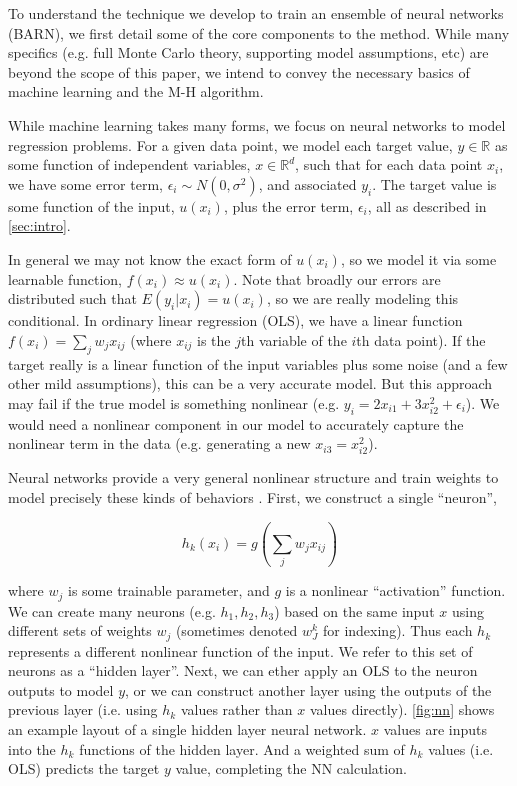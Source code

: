 \documentclass[12pt]{article}
\begin{document}

To understand the technique we develop to train an ensemble of neural networks (BARN), we first detail some of the core components to the method.  While many specifics (e.g. full Monte Carlo theory, supporting model assumptions, etc) are beyond the scope of this paper, we intend to convey the necessary basics of machine learning and the M-H algorithm.

While machine learning takes many forms, we focus on neural networks to model regression problems.  For a given data point, we model each target value, $y \in \mathbb{R}$ as some function of independent variables, $x \in \mathbb{R}^d$, such that for each data point $x_i$, we have some error term, $\epsilon_i \sim N(0,\sigma^2)$, and associated $y_i$.  The target value is some function of the input, $u(x_i)$, plus the error term, $\epsilon_i$, all as described in \ref{sec:intro}.

In general we may not know the exact form of $u(x_i)$, so we model it via some learnable function, $f(x_i) \approx u(x_i)$.  Note that broadly our errors are distributed such that $E(y_i|x_i) = u(x_i)$, so we are really modeling this conditional.  In ordinary linear regression (OLS), we have a linear function $f(x_i) = \sum_j w_j x_{ij}$ (where $x_{ij}$ is the $j$th variable of the $i$th data point).  If the target really is a linear function of the input variables plus some noise (and a few other mild assumptions), this can be a very accurate model.  But this approach may fail if the true model is something nonlinear (e.g. $y_i = 2x_{i1} + 3x_{i2}^2 + \epsilon_i$).  We would need a nonlinear component in our model to accurately capture the nonlinear term in the data (e.g. generating a new $x_{i3} =x_{i2}^2$).

Neural networks provide a very general nonlinear structure and train weights to model precisely these kinds of behaviors \cite{hastie2009elements}.  First, we construct a single ``neuron'',

$$
h_k(x_i) = g(\sum_j w_j x_{ij})
$$

where $w_j$ is some trainable parameter, and $g$ is a nonlinear ``activation'' function.  We can create many neurons (e.g. $h_1, h_2, h_3$) based on the same input $x$ using different sets of weights $w_j$ (sometimes denoted $w_J^k$ for indexing).  Thus each $h_k$ represents a different nonlinear function of the input.  We refer to this set of neurons as a ``hidden layer''.  Next, we can ether apply an OLS to the neuron outputs to model $y$, or we can construct another layer using the outputs of the previous layer (i.e. using $h_k$ values rather than $x$ values directly).  \autoref{fig:nn} shows an example layout of a single hidden layer neural network.  $x$ values are inputs into the $h_k$ functions of the hidden layer.  And a weighted sum of $h_k$ values  (i.e. OLS) predicts the target $y$ value, completing the NN calculation.
\end{document}
